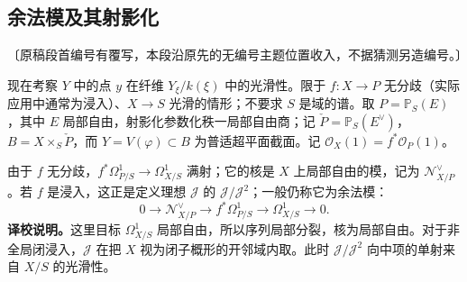\begingroup
\def\PP{\mathbb P}\def\OO{\mathcal O}\def\Ocal{\mathcal O}
\def\F{\mathcal F}\def\G{\mathcal G}\def\N{\mathcal N}
\def\PD{\check P}\def\Pdual{\check P}
\def\Ys{Y^{\mathrm{sing}}}\def\Ysing{Y^{\mathrm{sing}}}
\def\Ds{Y^{\mathrm{sup\,sing}}}\def\Ysup{Y^{\mathrm{sup\,sing}}}
\def\cod{\operatorname{codim}}\def\Sing{\operatorname{Sing}}
\def\depth{\operatorname{depth}}\def\coprof{\operatorname{coprof}}
\def\Ass{\operatorname{Ass}}\def\Supp{\operatorname{Supp}}
\def\Gr{\operatorname{Gr}}\def\Spec{\operatorname{Spec}}\def\Proj{\operatorname{Proj}}
\subsection*{余法模及其射影化}
\noindent〔原稿段首编号有覆写，本段沿原先的无编号主题位置收入，不据猜测另造编号。〕

现在考察 $Y$ 中的点 $y$ 在纤维 $Y_\xi/k(\xi)$ 中的光滑性。限于 $f:X\to P$ 无分歧（实际应用中通常为浸入）、$X\to S$ 光滑的情形；不要求 $S$ 是域的谱。取 $P=\PP_S(E)$，其中 $E$ 局部自由，射影化参数化秩一局部自由商；记 $\Pdual=\PP_S(E^\vee)$，$B=X\times_S\Pdual$，而 $Y=V(\varphi)\subset B$ 为普适超平面截面。记 $\Ocal_X(1)=f^*\Ocal_P(1)$。

由于 $f$ 无分歧，$f^*\Omega^1_{P/S}\to\Omega^1_{X/S}$ 满射；它的核是 $X$ 上局部自由的模，记为 $\N^\vee_{X/P}$。若 $f$ 是浸入，这正是定义理想 $\mathcal J$ 的 $\mathcal J/\mathcal J^2$；一般仍称它为余法模：
\begin{equation*}\tag{a}
0\longrightarrow \N^\vee_{X/P}\longrightarrow f^*\Omega^1_{P/S}
 \longrightarrow \Omega^1_{X/S}\longrightarrow0.
\end{equation*}
\noindent\textbf{译校说明。}这里目标 $\Omega^1_{X/S}$ 局部自由，所以序列局部分裂，核为局部自由。对于非全局闭浸入，$\mathcal J$ 在把 $X$ 视为闭子概形的开邻域内取。此时 $\mathcal J/\mathcal J^2$ 向中项的单射来自 $X/S$ 的光滑性。

